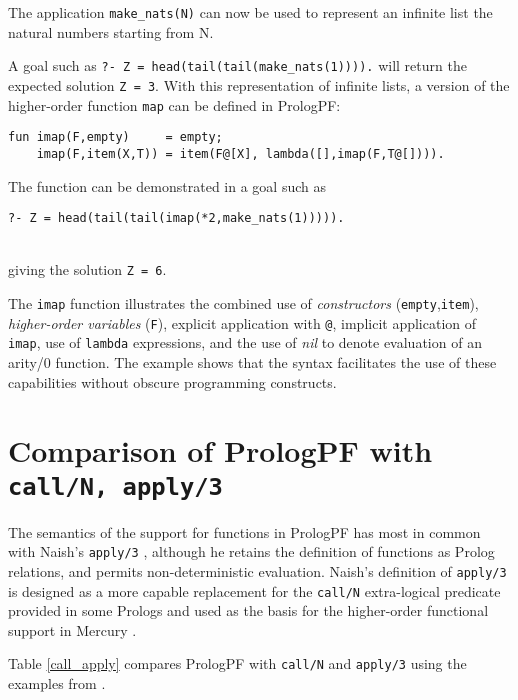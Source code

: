 The application \texttt{make\_{}nats(N)} can now be used to represent an
infinite list the natural numbers starting from N.

A goal such as \texttt{?- Z = head(tail(tail(make\_{}nats(1)))).} will
return the expected solution \texttt{Z = 3}.
With this representation of infinite lists, a version of the
higher-order function \texttt{map} can be defined in PrologPF:
\begin{verbatim}
fun imap(F,empty)     = empty;
    imap(F,item(X,T)) = item(F@[X], lambda([],imap(F,T@[]))).
\end{verbatim}
The function can be demonstrated in a goal such as\\
\centerline{\texttt{?- Z = head(tail(tail(imap(*2,make\_{}nats(1))))).}}\\
giving the solution \texttt{Z = 6}.

The \texttt{imap} function illustrates the combined use of
\textit{constructors} (\texttt{empty},\texttt{item}), \textit{higher-order
variables} (\texttt{F}), explicit application with \texttt{@}, implicit
application of \texttt{imap}, use of \texttt{lambda} expressions, and the
use of \textit{nil} to denote evaluation of an arity/0 function.
The example shows that the syntax facilitates the use of these capabilities
without obscure programming constructs.


\section{Comparison of PrologPF with \texttt{call/N, apply/3}} %

The semantics of the support for functions in PrologPF has most in
common with Naish's \texttt{apply/3} \cite{Nai96}, although he retains the
definition of functions as Prolog relations, and permits non-deterministic
evaluation.  Naish's definition of \texttt{apply/3} is designed as a more
capable replacement for the \texttt{call/N} extra-logical predicate provided
in some Prologs and used as the basis for the higher-order functional
support in Mercury \cite{SHC95}.

Table \ref{call_apply} compares PrologPF with \texttt{call/N} and \texttt{apply/3}
using the examples from \cite{Nai96}.


